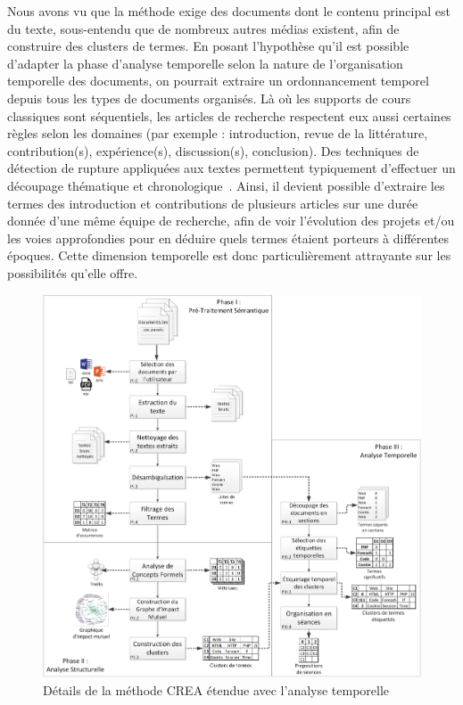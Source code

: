 Nous avons vu que la méthode exige des documents dont le contenu principal est du texte, sous-entendu que de nombreux autres médias existent, afin de construire des clusters de termes.
En posant l'hypothèse qu'il est possible d'adapter la phase d'analyse temporelle selon la nature de l'organisation temporelle des documents, on pourrait extraire un ordonnancement temporel depuis tous les types de documents organisés.
Là où les supports de cours classiques sont séquentiels, les articles de recherche respectent eux aussi certaines règles selon les domaines (par exemple : introduction, revue de la littérature, contribution(s), expérience(s), discussion(s), conclusion).
Des techniques de détection de rupture appliquées aux textes permettent typiquement d'effectuer un découpage thématique et chronologique~\cite{boufaden2002decoupage}\cite{fallery2007quatre}.
Ainsi, il devient possible d'extraire les termes des introduction et contributions de plusieurs articles sur une durée donnée d'une même équipe de recherche, afin de voir l'évolution des projets et/ou les voies approfondies pour en déduire quels termes étaient porteurs à différentes époques.
Cette dimension temporelle est donc particulièrement attrayante sur les possibilités qu'elle offre.


\newpage

\hspace{0pt}
\vfill

\begin{figure}[ht!]
\centering
\centerline{  %
\includegraphics[scale=0.6]{5-Conclusion/images/schema_final+temporel.png}
}
\caption{Détails de la méthode CREA étendue avec l'analyse temporelle}
\label{figure:5-MethodeGeneraleFinale+Temporel}
\end{figure}

\vfill
\hspace{0pt}
